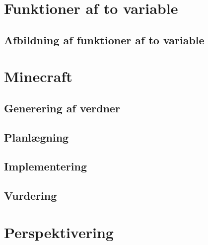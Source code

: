 \documentclass[a4paper,12pt]{report}
\begin{document}
	\section{Funktioner af to variable}
	\subsection{Afbildning af funktioner af to variable}
	\section{Minecraft}
	\subsection{Generering af verdner}
	\subsection{Planlægning}
	\subsection{Implementering}
	\subsection{Vurdering}
	\section{Perspektivering}
\end{document}
